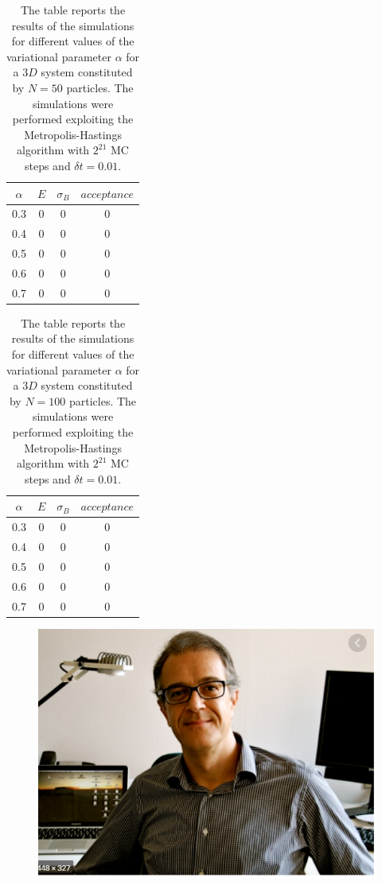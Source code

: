 \begin{table}[H]
    \centering
    \begin{tabular}{cccc}
        $\alpha$ & $E$ & $\sigma_B$ & $acceptance$ \\
        \midrule
        0.3 & 0 & 0 & 0 \\
        0.4 & 0 & 0 & 0 \\
        0.5 & 0 & 0 & 0 \\
        0.6 & 0 & 0 & 0 \\
        0.7 & 0 & 0 & 0 \\
        \bottomrule
    \end{tabular}
    \caption{The table reports the results of the simulations for different values of the variational parameter $\alpha$ for a $3D$ system constituted by $N=50$ particles. The simulations were performed exploiting the Metropolis-Hastings algorithm with $2^{21}$ MC steps and $\delta t=0.01$. }
    \label{tab:varying_alpha_interacting_50particles}
\end{table}

\begin{table}[H]
    \centering
    \begin{tabular}{cccc}
        $\alpha$ & $E$ & $\sigma_B$ & $acceptance$ \\
        \midrule
        0.3 & 0 & 0 & 0 \\
        0.4 & 0 & 0 & 0 \\
        0.5 & 0 & 0 & 0 \\
        0.6 & 0 & 0 & 0 \\
        0.7 & 0 & 0 & 0 \\
    \end{tabular}
    \caption{The table reports the results of the simulations for different values of the variational parameter $\alpha$ for a $3D$ system constituted by $N=100$ particles. The simulations were performed exploiting the Metropolis-Hastings algorithm with $2^{21}$ MC steps and $\delta t=0.01$. }
    \label{tab:varying_alpha_interacting_100particles}
\end{table}


\begin{figure}[H]
    \includegraphics[scale=0.5]{images/yaaaa.png}
    \caption{}
    \label{fig:asymm_symm_comparison}
\end{figure}



